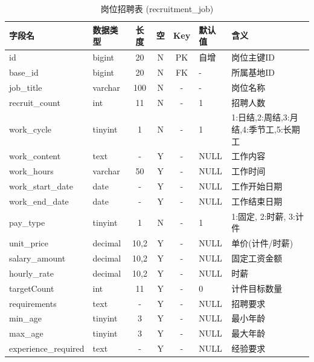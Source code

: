 \documentclass[UTF8,a4paper,12pt]{article}
\begin{document}
\begin{table}[H]
    \centering
    \caption{岗位招聘表 (recruitment\_job)}
    \label{tab:recruitment_job}
    \small
    \renewcommand{\arraystretch}{1.3}
    \begin{tabular}{|l|l|c|c|c|l|l|}
        \hline
        \rowcolor{gray!15} \textbf{字段名} & \textbf{数据类型} & \textbf{长度} & \textbf{空} & \textbf{Key} & \textbf{默认值} & \textbf{含义} \\ \hline
        id & bigint & 20 & N & PK & 自增 & 岗位主键ID \\ \hline
        base\_id & bigint & 20 & N & FK & - & 所属基地ID \\ \hline
        job\_title & varchar & 100 & N & - & - & 岗位名称 \\ \hline
        recruit\_count & int & 11 & N & - & 1 & 招聘人数 \\ \hline
        work\_cycle & tinyint & 1 & N & - & 1 & 1:日结,2:周结,3:月结,4:季节工,5:长期工 \\ \hline
        work\_content & text & - & Y & - & NULL & 工作内容 \\ \hline
        work\_hours & varchar & 50 & Y & - & NULL & 工作时间 \\ \hline
        work\_start\_date & date & - & Y & - & NULL & 工作开始日期 \\ \hline
        work\_end\_date & date & - & Y & - & NULL & 工作结束日期 \\ \hline
        pay\_type & tinyint & 1 & N & - & 1 & 1:固定, 2:时薪, 3:计件 \\ \hline
        unit\_price & decimal & 10,2 & Y & - & NULL & 单价(计件/时薪) \\ \hline
        salary\_amount & decimal & 10,2 & Y & - & NULL & 固定工资金额 \\ \hline
        hourly\_rate & decimal & 10,2 & Y & - & NULL & 时薪 \\ \hline
        targetCount & int & 11 & Y & - & 0 & 计件目标数量 \\ \hline
        requirements & text & - & Y & - & NULL & 招聘要求 \\ \hline
        min\_age & tinyint & 3 & Y & - & NULL & 最小年龄 \\ \hline
        max\_age & tinyint & 3 & Y & - & NULL & 最大年龄 \\ \hline
        experience\_required & text & - & Y & - & NULL & 经验要求 \\ \hline

\end{tabular}
\end{table}
\end{document}
